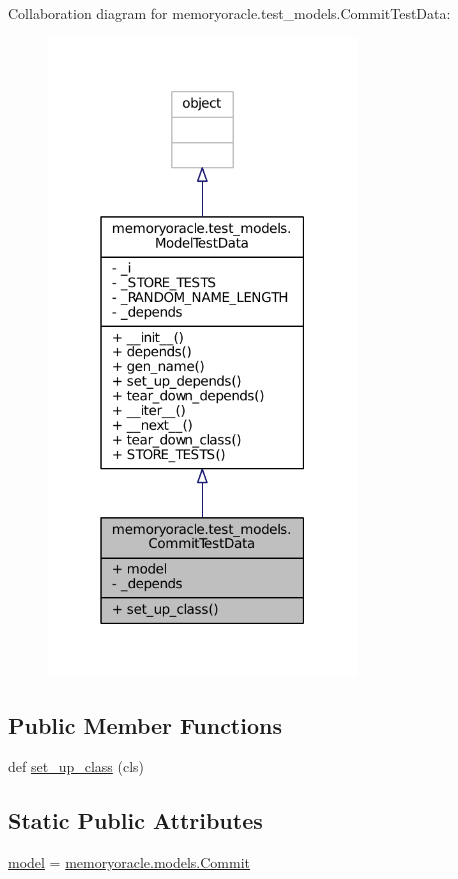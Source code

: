 Collaboration diagram for memoryoracle.\+test\+\_\+models.\+Commit\+Test\+Data\+:\nopagebreak
\begin{figure}[H]
\begin{center}
\leavevmode
\includegraphics[width=232pt]{classmemoryoracle_1_1test__models_1_1CommitTestData__coll__graph}
\end{center}
\end{figure}
\subsection*{Public Member Functions}
\begin{DoxyCompactItemize}
\item 
def \hyperlink{classmemoryoracle_1_1test__models_1_1CommitTestData_a27d442f991377050929bb9dde59ac3ee}{set\+\_\+up\+\_\+class} (cls)
\end{DoxyCompactItemize}
\subsection*{Static Public Attributes}
\begin{DoxyCompactItemize}
\item 
\hyperlink{classmemoryoracle_1_1test__models_1_1CommitTestData_a1d7335c322637a6769200489933b9338}{model} = \hyperlink{classmemoryoracle_1_1models_1_1Commit}{memoryoracle.\+models.\+Commit}
\end{DoxyCompactItemize}
